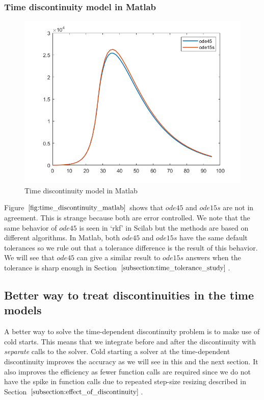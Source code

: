 \subsubsection{Time discontinuity model in Matlab}
\begin{figure}[h]
\centering
\includegraphics[width=0.7\linewidth]{./figures/time_discontinuity_matlab}
\caption{Time discontinuity model in Matlab}
\label{fig:time_discontinuity_matlab}
\end{figure}
Figure $\ref{fig:time_discontinuity_matlab}$ shows that $ode45$ and $ode15s$ are not in agreement. This is strange because both are error controlled. We note that the same behavior of $ode45$ is seen in `rkf' in Scilab but the methods are based on different algorithms. In Matlab, both $ode45$ and $ode15s$ have the same default tolerances so we rule out that a tolerance difference is the result of this behavior. We will see that $ode45$ can give a similar result to $ode15s$ answers when the tolerance is sharp enough in Section $\ref{subsection:time_tolerance_study}$.

\subsection{Better way to treat discontinuities in the time models}
\label{subsection:time_disc_handling}
A better way to solve the time-dependent discontinuity problem is to make use of cold starts. This means that we integrate before and after the discontinuity with \emph{separate} calls to the solver. Cold starting a solver at the time-dependent discontinuity improves the accuracy as we will see in this and the next section. It also improves the efficiency as fewer function calls are required since we do not have the spike in function calls due to repeated step-size resizing described in Section $\ref{subsection:effect_of_discontinuity}$.

